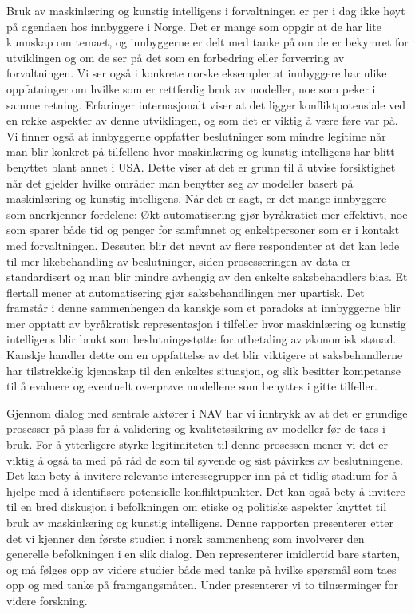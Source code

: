 \documentclass[
]{book}
\begin{document}
Bruk av maskinlæring og kunstig intelligens i forvaltningen er per i dag ikke høyt på agendaen hos innbyggere i Norge.
Det er mange som oppgir at de har lite kunnskap om temaet, og innbyggerne er delt med tanke på om de er bekymret for utviklingen og om de ser på det som en forbedring eller forverring av forvaltningen.
Vi ser også i konkrete norske eksempler at innbyggere har ulike oppfatninger om hvilke som er rettferdig bruk av modeller, noe som peker i samme retning.
Erfaringer internasjonalt viser at det ligger konfliktpotensiale ved en rekke aspekter av denne utviklingen, og som det er viktig å være føre var på.
Vi finner også at innbyggerne oppfatter beslutninger som mindre legitime når man blir konkret på tilfellene hvor maskinlæring og kunstig intelligens har blitt benyttet blant annet i USA.
Dette viser at det er grunn til å utvise forsiktighet når det gjelder hvilke områder man benytter seg av modeller basert på maskinlæring og kunstig intelligens.
Når det er sagt, er det mange innbyggere som anerkjenner fordelene:
Økt automatisering gjør byråkratiet mer effektivt, noe som sparer både tid og penger for samfunnet og enkeltpersoner som er i kontakt med forvaltningen.
Dessuten blir det nevnt av flere respondenter at det kan lede til mer likebehandling av beslutninger, siden prosesseringen av data er standardisert og man blir mindre avhengig av den enkelte saksbehandlers bias.
Et flertall mener at automatisering gjør saksbehandlingen mer upartisk.
Det framstår i denne sammenhengen da kanskje som et paradoks at innbyggerne blir mer opptatt av byråkratisk representasjon i tilfeller hvor maskinlæring og kunstig intelligens blir brukt som beslutningsstøtte for utbetaling av økonomisk stønad.
Kanskje handler dette om en oppfattelse av det blir viktigere at saksbehandlerne har tilstrekkelig kjennskap til den enkeltes situasjon, og slik besitter kompetanse til å evaluere og eventuelt overprøve modellene som benyttes i gitte tilfeller.

Gjennom dialog med sentrale aktører i NAV har vi inntrykk av at det er grundige prosesser på plass for å validering og kvalitetssikring av modeller før de taes i bruk.
For å ytterligere styrke legitimiteten til denne prosessen mener vi det er viktig å også ta med på råd de som til syvende og sist påvirkes av beslutningene.
Det kan bety å invitere relevante interessegrupper inn på et tidlig stadium for å hjelpe med å identifisere potensielle konfliktpunkter.
Det kan også bety å invitere til en bred diskusjon i befolkningen om etiske og politiske aspekter knyttet til bruk av maskinlæring og kunstig intelligens.
Denne rapporten presenterer etter det vi kjenner den første studien i norsk sammenheng som involverer den generelle befolkningen i en slik dialog.
Den representerer imidlertid bare starten, og må følges opp av videre studier både med tanke på hvilke spørsmål som taes opp og med tanke på framgangsmåten.
Under presenterer vi to tilnærminger for videre forskning.
\end{document}
